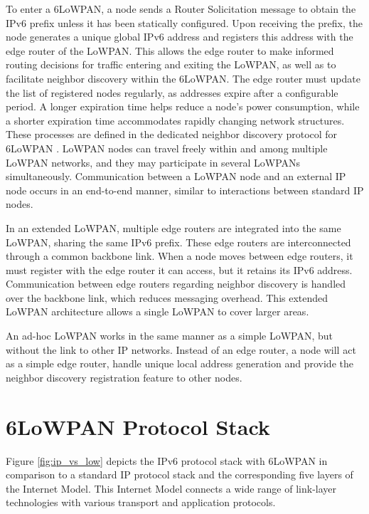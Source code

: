   To enter a 6LoWPAN, a node sends a Router Solicitation message to obtain the IPv6 prefix unless it
  has been statically configured. Upon receiving the prefix, the node generates a unique global IPv6 
  address and registers this address with the edge router of the LoWPAN. This allows the edge router 
  to make informed routing decisions for traffic entering and exiting the LoWPAN, as well as to 
  facilitate neighbor discovery within the 6LoWPAN. The edge router must update the list of registered 
  nodes regularly, as addresses expire after a configurable period.  A longer expiration time 
  helps reduce a node's power consumption, while a shorter expiration time accommodates rapidly 
  changing network structures. These processes are defined in the dedicated neighbor discovery
  protocol for 6LoWPAN \cite{rfc6775}. LoWPAN nodes can travel freely within and among multiple 
  LoWPAN networks, and they may participate in several LoWPANs simultaneously. Communication 
  between a LoWPAN node and an external IP node occurs in an end-to-end manner, similar to 
  interactions between standard IP nodes.

  In an extended LoWPAN, multiple edge routers are integrated into the same LoWPAN, 
  sharing the same IPv6 prefix. These edge routers are interconnected through a common backbone link. 
  When a node moves between edge routers, it must register with the edge router it can access, 
  but it retains its IPv6 address. Communication between edge routers regarding neighbor 
  discovery is handled over the backbone link, which reduces messaging overhead. 
  This extended LoWPAN architecture allows a single LoWPAN to cover larger areas.

  An ad-hoc LoWPAN works in the same manner as a simple LoWPAN, but without the link to other
  IP networks. Instead of an edge router, a node will act as a simple edge router, handle unique 
  local address generation \cite{rfc4193} and provide the neighbor discovery registration feature 
  to other nodes.

\section{6LoWPAN Protocol Stack}
  Figure \ref{fig:ip_vs_low} depicts the IPv6 protocol stack with 6LoWPAN in comparison to a standard IP protocol 
  stack and the corresponding five layers of the Internet Model. This Internet Model 
  connects a wide range of link-layer technologies with various transport and application protocols.


